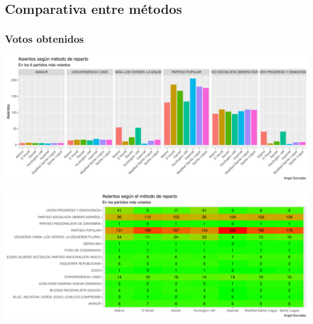 \documentclass[12pt,a4paper,]{book}
\numberwithin{dummy}{section}
\theoremstyle{ocrenumbox}
\theoremstyle{blacknumex}
\theoremstyle{blacknumbox}
\theoremstyle{ocrenum}
\theoremstyle{ocrenum}
\begin{document}
\hypertarget{comparativa-entre-muxe9todos-10}{%
\subsection{Comparativa entre
métodos}\label{comparativa-entre-muxe9todos-10}}

\hypertarget{votos-obtenidos-10}{%
\subsubsection{Votos obtenidos}\label{votos-obtenidos-10}}

\begin{center}\includegraphics[width=0.95\linewidth]{figurasR/unnamed-chunk-149-1} \end{center}

\begin{center}\includegraphics[width=0.95\linewidth]{figurasR/unnamed-chunk-149-2} \end{center}
\end{document}
